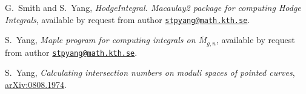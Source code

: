 \documentclass{amsart}
\newcommand{\arXiv}[1]{\href{http://arxiv.org/abs/#1}{arXiv:#1}}
\theoremstyle{plain}
\theoremstyle{definition}
\begin{document}
\begin{thebibliography}{2}
  G.~Smith and S.~Yang,
  \emph{HodgeIntegral. Macaulay2 package for computing Hodge Integrals},
  available by request from author \href{mailto:stpyang@math.kth.se}
  {\texttt{stpyang@math.kth.se}}.

  S.~Yang,
  \emph{Maple program for computing integrals on $\overline{M}_{g,n}$},
  available by request from author \href{mailto:stpyang@math.kth.se}
  {\texttt{stpyang@math.kth.se}}.

  S.~Yang,
  \emph{Calculating intersection numbers on moduli spaces of pointed curves},
  \arXiv{0808.1974}.%

\end{thebibliography}
\end{document}
